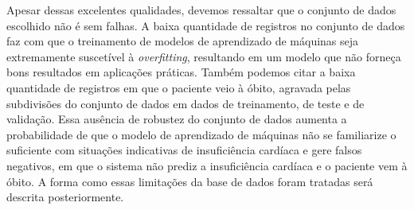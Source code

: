 Apesar dessas excelentes qualidades, devemos ressaltar que o conjunto de dados escolhido não é sem falhas. A baixa quantidade de registros no conjunto de dados faz com que o treinamento de modelos de aprendizado de máquinas seja extremamente suscetível à \textit{overfitting}, resultando em um modelo que não forneça bons resultados em aplicações práticas. Também podemos citar a baixa quantidade de registros em que o paciente veio à óbito, agravada pelas subdivisões do conjunto de dados em dados de treinamento, de teste e de validação. Essa ausência de robustez do conjunto de dados aumenta a probabilidade de que o modelo de aprendizado de máquinas não se familiarize o suficiente com situações indicativas de insuficiência cardíaca e gere falsos negativos, em que o sistema não prediz a insuficiência cardíaca e o paciente vem à óbito. A forma como essas limitações da base de dados foram tratadas será descrita posteriormente.



